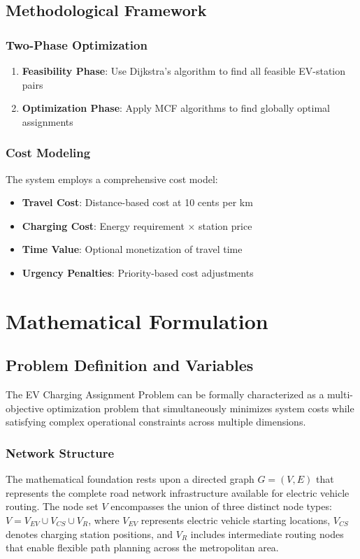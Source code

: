 \documentclass[12pt,a4paper]{article}
\begin{document}
\subsection{Methodological Framework}

\subsubsection{Two-Phase Optimization}
\begin{enumerate}
    \item \textbf{Feasibility Phase}: Use Dijkstra's algorithm to find all feasible EV-station pairs
    \item \textbf{Optimization Phase}: Apply MCF algorithms to find globally optimal assignments
\end{enumerate}

\subsubsection{Cost Modeling}
The system employs a comprehensive cost model:
\begin{itemize}
    \item \textbf{Travel Cost}: Distance-based cost at 10 cents per km
    \item \textbf{Charging Cost}: Energy requirement × station price
    \item \textbf{Time Value}: Optional monetization of travel time
    \item \textbf{Urgency Penalties}: Priority-based cost adjustments
\end{itemize}

\section{Mathematical Formulation}

\subsection{Problem Definition and Variables}

The EV Charging Assignment Problem can be formally characterized as a multi-objective optimization problem that simultaneously minimizes system costs while satisfying complex operational constraints across multiple dimensions.

\subsubsection{Network Structure}
The mathematical foundation rests upon a directed graph $G = (V, E)$ that represents the complete road network infrastructure available for electric vehicle routing. The node set $V$ encompasses the union of three distinct node types: $V = V_{EV} \cup V_{CS} \cup V_{R}$, where $V_{EV}$ represents electric vehicle starting locations, $V_{CS}$ denotes charging station positions, and $V_{R}$ includes intermediate routing nodes that enable flexible path planning across the metropolitan area.
\end{document}
